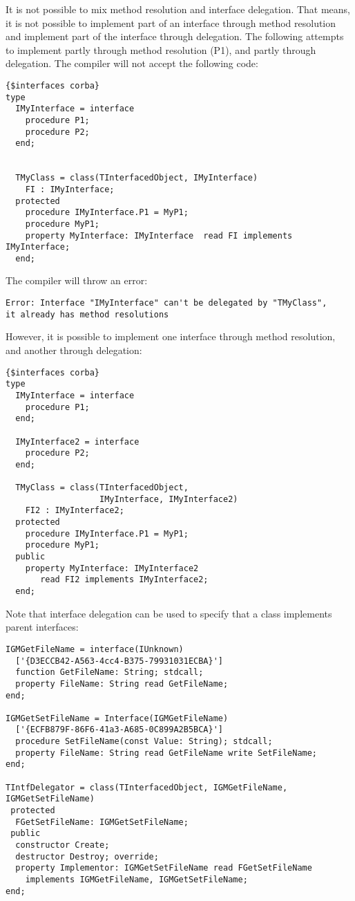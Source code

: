 It is not possible to mix method resolution and interface delegation. 
That means, it is not possible to implement part of an interface through
method resolution and implement part of the interface through delegation. 
The following attempts to implement  partly through method
resolution (P1), and partly through delegation. The compiler will not accept
the following code:
\begin{verbatim}
{$interfaces corba}
type
  IMyInterface = interface
    procedure P1;
    procedure P2;
  end;


  TMyClass = class(TInterfacedObject, IMyInterface)
    FI : IMyInterface; 
  protected
    procedure IMyInterface.P1 = MyP1;
    procedure MyP1;
    property MyInterface: IMyInterface  read FI implements IMyInterface;
  end;
\end{verbatim}
The compiler will throw an error:
\begin{verbatim}
Error: Interface "IMyInterface" can't be delegated by "TMyClass", 
it already has method resolutions
\end{verbatim}

However, it is possible to implement one interface through method
resolution, and another through delegation:
\begin{verbatim}
{$interfaces corba}
type
  IMyInterface = interface
    procedure P1;
  end;

  IMyInterface2 = interface
    procedure P2;
  end;

  TMyClass = class(TInterfacedObject, 
                   IMyInterface, IMyInterface2)
    FI2 : IMyInterface2;
  protected
    procedure IMyInterface.P1 = MyP1;
    procedure MyP1;
  public 
    property MyInterface: IMyInterface2
       read FI2 implements IMyInterface2;
  end;
\end{verbatim}

Note that interface delegation can be used to specify that a class
implements parent interfaces:
\begin{verbatim}
IGMGetFileName = interface(IUnknown)
  ['{D3ECCB42-A563-4cc4-B375-79931031ECBA}']
  function GetFileName: String; stdcall;
  property FileName: String read GetFileName;
end;

IGMGetSetFileName = Interface(IGMGetFileName)
  ['{ECFB879F-86F6-41a3-A685-0C899A2B5BCA}']
  procedure SetFileName(const Value: String); stdcall;
  property FileName: String read GetFileName write SetFileName;
end;

TIntfDelegator = class(TInterfacedObject, IGMGetFileName, IGMGetSetFileName)
 protected
  FGetSetFileName: IGMGetSetFileName;
 public
  constructor Create;
  destructor Destroy; override;
  property Implementor: IGMGetSetFileName read FGetSetFileName 
    implements IGMGetFileName, IGMGetSetFileName;
end;
\end{verbatim}

